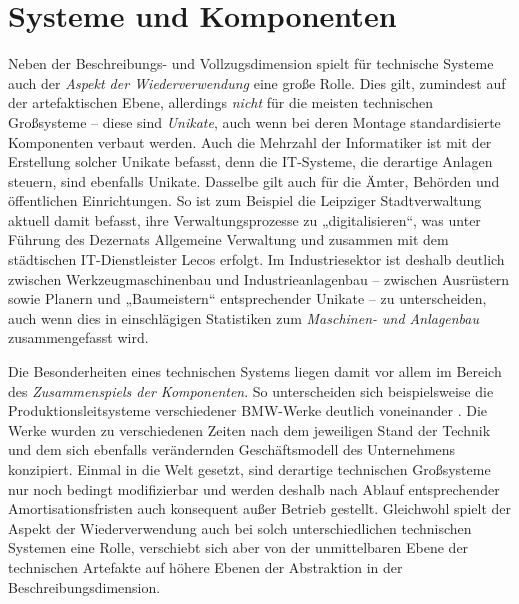 \documentclass[11pt,a4paper]{article}
\begin{document}
\section{Systeme und Komponenten}

Neben der Beschreibungs- und Vollzugsdimension spielt für technische Systeme
auch der \emph{Aspekt der Wiederverwendung} eine große Rolle.  Dies gilt,
zumindest auf der artefaktischen Ebene, allerdings \emph{nicht} für die
meisten technischen Großsysteme -- diese sind \emph{Unikate}, auch wenn bei
deren Montage standardisierte Komponenten verbaut werden. Auch die Mehrzahl
der Informatiker ist mit der Erstellung solcher Unikate befasst, denn die
IT-Systeme, die derartige Anlagen steuern, sind ebenfalls Unikate.  Dasselbe
gilt auch für die Ämter, Behörden und öffentlichen Einrichtungen. So ist zum
Beispiel die Leipziger Stadtverwaltung aktuell damit befasst, ihre
Verwaltungsprozesse zu „digitalisieren“, was unter Führung des Dezernats
Allgemeine Verwaltung und zusammen mit dem städtischen IT-Dienstleister Lecos
erfolgt. Im Industriesektor ist deshalb deutlich zwischen Werkzeugmaschinenbau
und Industrieanlagenbau -- zwischen Ausrüstern sowie Planern und „Baumeistern“
entsprechender Unikate -- zu unterscheiden, auch wenn dies in einschlägigen
Statistiken \cite{VDMA2019} zum \emph{Maschinen- und Anlagenbau}
zusammengefasst wird.

Die Besonderheiten eines technischen Systems liegen damit vor allem im Bereich
des \emph{Zusammenspiels der Komponenten}. So unterscheiden sich
beispielsweise die Produktionsleitsysteme verschiedener BMW-Werke deutlich
voneinander \cite{Kropik2009}. Die Werke wurden zu verschiedenen Zeiten nach
dem jeweiligen Stand der Technik und dem sich ebenfalls verändernden
Geschäftsmodell des Unternehmens konzipiert. Einmal in die Welt gesetzt, sind
derartige technischen Großsysteme nur noch bedingt modifizierbar und werden
deshalb nach Ablauf entsprechender Amortisationsfristen auch konsequent außer
Betrieb gestellt. Gleichwohl spielt der Aspekt der Wiederverwendung auch bei
solch unterschiedlichen technischen Systemen eine Rolle, verschiebt sich aber
von der unmittelbaren Ebene der technischen Artefakte auf höhere Ebenen der
Abstraktion in der Beschreibungsdimension.
\end{document}
